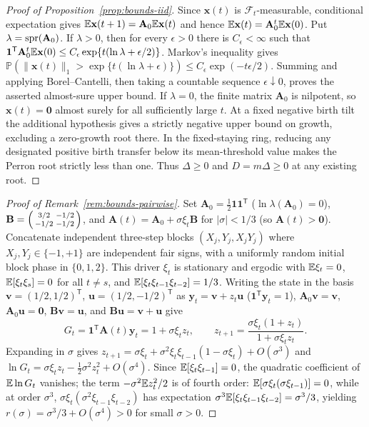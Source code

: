 \begin{proof}[Proof of Proposition~{\upshape\ref{prop:bounds-iid}}]
Since $\mathbf x(t)$ is $\mathcal F_t$-measurable, conditional expectation gives $\mathbb{E}\mathbf x(t+1)=\mathbf A_0\mathbb{E}\mathbf x(t)$ and hence $\mathbb{E}\mathbf x(t)=\mathbf A_0^t\mathbb{E}\mathbf x(0)$. Put $\lambda=\operatorname{spr}(\mathbf A_0)$. If $\lambda>0$, then for every $\epsilon>0$ there is $C_\epsilon<\infty$ such that $\mathbf1^{\mathsf T}\mathbf A_0^t\mathbb{E}\mathbf x(0)\leq C_\epsilon\exp\{t(\ln\lambda+\epsilon/2)\}$. Markov's inequality gives $\mathbb P(\|\mathbf x(t)\|_1>\exp\{t(\ln\lambda+\epsilon)\})\leq C_\epsilon\exp(-t\epsilon/2)$. Summing and applying Borel--Cantelli, then taking a countable sequence $\epsilon\downarrow0$, proves the asserted almost-sure upper bound. If $\lambda=0$, the finite matrix $\mathbf A_0$ is nilpotent, so $\mathbf x(t)=\mathbf0$ almost surely for all sufficiently large $t$. At a fixed negative birth tilt the additional hypothesis gives a strictly negative upper bound on growth, excluding a zero-growth root there. In the fixed-staying ring, reducing any designated positive birth transfer below its mean-threshold value makes the Perron root strictly less than one. Thus $\Delta\geq0$ and $D=m\Delta\geq0$ at any existing root.
\end{proof}

\begin{proof}[Proof of Remark~{\upshape\ref{rem:bounds-pairwise}}]
Set $\mathbf{A}_0 = \frac{1}{2}\mathbf{1}\mathbf{1}^{\mathsf{T}}$ ($\ln\lambda(\mathbf{A}_0) = 0$), $\mathbf{B} = \begin{psmallmatrix} 3/2 & -1/2 \\ -1/2 & -1/2 \end{psmallmatrix}$, and $\mathbf{A}(t) = \mathbf{A}_0 + \sigma\xi_t\mathbf{B}$ for $|\sigma| < 1/3$ (so $\mathbf{A}(t) > \mathbf{0}$). Concatenate independent three-step blocks $(X_j, Y_j, X_j Y_j)$ where $X_j, Y_j \in \{-1, +1\}$ are independent fair signs, with a uniformly random initial block phase in $\{0, 1, 2\}$. This driver $\xi_t$ is stationary and ergodic with $\mathbb{E}\xi_t = 0$, $\mathbb{E}[\xi_t\xi_s] = 0$ for all $t \ne s$, and $\mathbb{E}[\xi_t\xi_{t-1}\xi_{t-2}] = 1/3$. Writing the state in the basis $\mathbf{v} = (1/2, 1/2)^{\mathsf{T}}$, $\mathbf{u} = (1/2, -1/2)^{\mathsf{T}}$ as $\mathbf{y}_t = \mathbf{v} + z_t\mathbf{u}$ ($\mathbf{1}^{\mathsf{T}}\mathbf{y}_t = 1$), $\mathbf{A}_0\mathbf{v} = \mathbf{v}$, $\mathbf{A}_0\mathbf{u} = \mathbf{0}$, $\mathbf{B}\mathbf{v} = \mathbf{u}$, and $\mathbf{B}\mathbf{u} = \mathbf{v} + \mathbf{u}$ give
\[
G_t = \mathbf{1}^{\mathsf{T}}\mathbf{A}(t)\mathbf{y}_t = 1 + \sigma\xi_t z_t, \qquad z_{t+1} = \frac{\sigma\xi_t(1 + z_t)}{1 + \sigma\xi_t z_t}.
\]
Expanding in $\sigma$ gives $z_{t+1} = \sigma\xi_t + \sigma^2\xi_t\xi_{t-1}(1 - \sigma\xi_t) + O(\sigma^3)$ and $\ln G_t = \sigma\xi_t z_t - \frac{1}{2}\sigma^2 z_t^2 + O(\sigma^4)$. Since $\mathbb{E}[\xi_t\xi_{t-1}]=0$, the quadratic coefficient of $\mathbb{E}\ln G_t$ vanishes; the term $-\sigma^2\mathbb{E} z_t^2/2$ is of fourth order: $\mathbb{E}[\sigma\xi_t(\sigma\xi_{t-1})] = 0$, while at order $\sigma^3$, $\sigma\xi_t(\sigma^2\xi_{t-1}\xi_{t-2})$ has expectation $\sigma^3\mathbb{E}[\xi_t\xi_{t-1}\xi_{t-2}] = \sigma^3/3$, yielding $r(\sigma) = \sigma^3/3 + O(\sigma^4) > 0$ for small $\sigma > 0$.
\end{proof}

